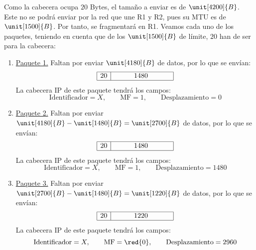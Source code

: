 \begin{ejemplo}
    Como la cabecera ocupa $20$ Bytes, el tamaño a enviar es de $\unit[4200]{B}$. Este no se podrá enviar por la red que une R1 y R2, pues su \acrshort{MTU} es de $\unit[1500]{B}$. Por tanto, se fragmentará en R1. Veamos cada uno de los paquetes, teniendo en cuenta que de los $\unit[1500]{B}$ de límite, $20$ han de ser para la cabecera:
    \begin{enumerate}
        \item \ul{Paquete 1.} Faltan por enviar $\unit[4180]{B}$ de datos, por lo que se envían:
        \begin{equation*}
            \begin{array}{|c|c|}
                \hline 20 & \hspace{1cm} 1480 \hspace{1cm}~\\ \hline
            \end{array}
        \end{equation*}
        La cabecera IP de este paquete tendrá los campos:
        \begin{equation*}
            \text{Identificador} = X,\qquad \text{MF} = 1,\qquad \text{Desplazamiento} = 0
        \end{equation*}

        \item \ul{Paquete 2.} Faltan por enviar $\unit[4180]{B}-\unit[1480]{B}=\unit[2700]{B}$ de datos, por lo que se envían:
        \begin{equation*}
            \begin{array}{|c|c|}
                \hline 20 & \hspace{1cm} 1480 \hspace{1cm}~\\ \hline
            \end{array}
        \end{equation*}
        La cabecera IP de este paquete tendrá los campos:
        \begin{equation*}
            \text{Identificador} = X,\qquad \text{MF} = 1,\qquad \text{Desplazamiento} = 1480
        \end{equation*}

        \item \ul{Paquete 3.} Faltan por enviar $\unit[2700]{B}-\unit[1480]{B}=\unit[1220]{B}$ de datos, por lo que se envían:
        \begin{equation*}
            \begin{array}{|c|c|}
                \hline 20 & \hspace{1cm} 1220 \hspace{1cm}~\\ \hline
            \end{array}
        \end{equation*}
        La cabecera IP de este paquete tendrá los campos:
        \begin{equation*}
            \text{Identificador} = X,\qquad \text{MF} = \red{0},\qquad \text{Desplazamiento} = 2960
        \end{equation*}
    \end{enumerate}


\end{ejemplo}
